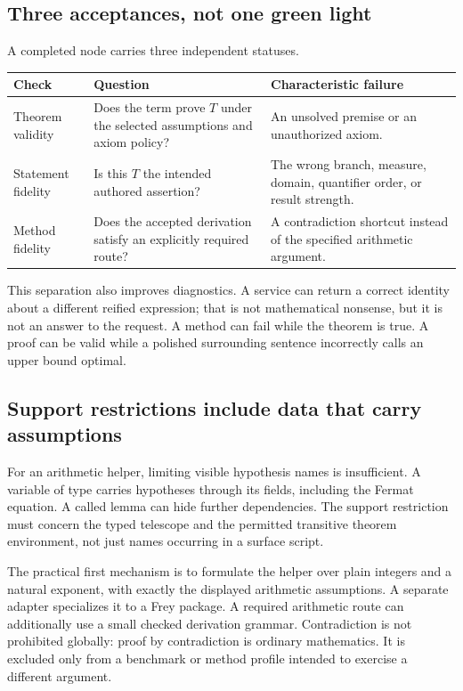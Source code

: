 \documentclass[11pt,letterpaper]{article}
\newcommand{\code}[1]{\texttt{\detokenize{#1}}}
\theoremstyle{definition}\newtheorem{definition}[theorem]{Definition}
\theoremstyle{remark}\newtheorem{remark}[theorem]{Remark}
\begin{document}
\subsection{Three acceptances, not one green light}
A completed node carries three independent statuses.
\begin{center}\small
\begin{tabularx}{\textwidth}{@{}P{.22\textwidth}Y Y@{}}
\toprule Check & Question & Characteristic failure\\\midrule
Theorem validity & Does the term prove $T$ under the selected assumptions and axiom policy? & An unsolved premise or an unauthorized axiom.\\
Statement fidelity & Is this $T$ the intended authored assertion? & The wrong branch, measure, domain, quantifier order, or result strength.\\
Method fidelity & Does the accepted derivation satisfy an explicitly required route? & A contradiction shortcut instead of the specified arithmetic argument.\\
\bottomrule
\end{tabularx}
\end{center}

This separation also improves diagnostics. A service can return a correct
identity about a different reified expression; that is not mathematical
nonsense, but it is not an answer to the request. A method can fail while the
theorem is true. A proof can be valid while a polished surrounding sentence
incorrectly calls an upper bound optimal.

\subsection{Support restrictions include data that carry assumptions}
For an arithmetic helper, limiting visible hypothesis names is insufficient.
A variable of type \code{FreyPackage} carries hypotheses through its fields,
including the Fermat equation. A called lemma can hide further dependencies.
The support restriction must concern the typed telescope and the permitted
transitive theorem environment, not just names occurring in a surface script.

The practical first mechanism is to formulate the helper over plain integers
and a natural exponent, with exactly the displayed arithmetic assumptions.
A separate adapter specializes it to a Frey package. A required arithmetic
route can additionally use a small checked derivation grammar. Contradiction
is not prohibited globally: proof by contradiction is ordinary mathematics.
It is excluded only from a benchmark or method profile intended to exercise
a different argument.
\end{document}
